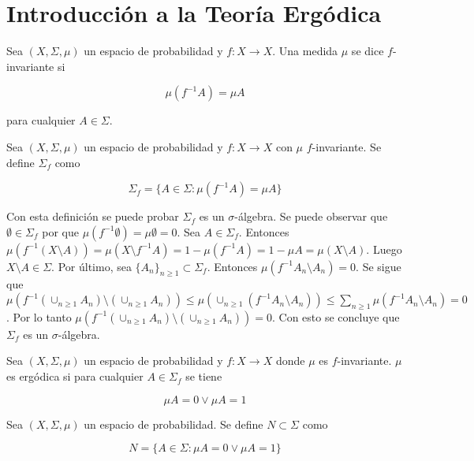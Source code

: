 \section{Introducción a la Teoría Ergódica}

\begin{definicion}
	Sea $(X,\Sigma,\mu)$ un espacio de probabilidad y $f: X \rightarrow X$. Una medida $\mu$ se dice $f$-invariante si
	
	\begin{equation}
		\mu(f^{-1}A) = \mu A
	\end{equation}
	
	para cualquier $A \in \Sigma$.
\end{definicion}

\begin{definicion}
	Sea $(X,\Sigma,\mu)$ un espacio de probabilidad y $f: X \rightarrow X$ con $\mu$ $f$-invariante. Se define $\Sigma_f$ como
	
	\begin{equation}
		\Sigma_f = \{ A \in \Sigma: \mu(f^{-1}A) = \mu A \}
	\end{equation}
\end{definicion}

Con esta definición se puede probar $\Sigma_f$ es un $\sigma$-álgebra. Se puede observar que $\emptyset \in \Sigma_f$ por que $\mu(f^{-1} \emptyset) = \mu \emptyset = 0$. Sea $A \in \Sigma_f$. Entonces $\mu(f^{-1}(X \setminus A)) =  \mu(X \setminus f^{-1}A) = 1 - \mu(f^{-1}A) = 1 - \mu A = \mu(X \setminus A)$. Luego $X \setminus A \in \Sigma$. Por último, sea $\{A_n\}_{n \geq 1} \subset \Sigma_f$. Entonces $\mu(f^{-1}A_n \setminus A_n) = 0$. Se sigue que $\mu(f^{-1}(\cup_{n \geq 1} A_n) \setminus (\cup_{n \geq 1} A_n)) \leq \mu(\cup_{n \geq 1} (f^{-1}A_n \setminus A_n)) \leq \sum_{n \geq 1} \mu(f^{-1}A_n \setminus A_n) = 0$. Por lo tanto $\mu(f^{-1}(\cup_{n \geq 1} A_n) \setminus (\cup_{n \geq 1} A_n)) = 0$. Con esto se concluye que $\Sigma_f$ es un $\sigma$-álgebra. 

\begin{definicion}
	Sea $(X,\Sigma,\mu)$ un espacio de probabilidad y $f: X \rightarrow X$ donde $\mu$ es $f$-invariante. $\mu$ es ergódica si para cualquier $A \in \Sigma_f$ se tiene
	
	\begin{equation}
		\mu A = 0 \vee \mu A = 1
	\end{equation}
\end{definicion}

\begin{definicion}\label{trivial_sigma-algebra}
	Sea $(X,\Sigma,\mu)$ un espacio de probabilidad. Se define $N \subset \Sigma$ como
	
	\begin{equation}
		N = \{ A \in \Sigma: \mu A = 0 \vee \mu A = 1 \}
	\end{equation}
\end{definicion}


